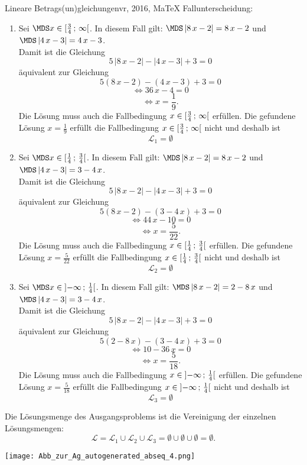 \begin{MAufgabe}{Lineare Betrags(un)gleichungen}{vr, 2016, MaTeX}
 Fallunterscheidung: 

 \begin{enumerate} 
 \item Sei $ \MDS x\in[ \frac{3}{4} \, \MIntvlSep \, \infty\MoIr $. 
 In diesem Fall gilt: 
  $ \MDS \left| 8\, x - 2\right|=8\, x - 2$ und $ \MDS \left| 4\, x - 3\right|=4\, x - 3$. \\ 
 Damit ist die Gleichung 
 $$ 
5\, \left|8\, x - 2\right| - \left|4\, x - 3\right| + 3= 0
$$
 \"aquivalent zur Gleichung
 $$ 
5\left(8\, x - 2\right)-\left( 4\, x - 3\right)+3= 0 
$$  
$$ 
 \Leftrightarrow 36\, x - 4= 0 
$$  
$$ \Leftrightarrow x = \frac{1}{9} . 
 $$ 
 Die L\"osung muss auch die Fallbedingung $x\in [ \frac{3}{4} \, ; \, \infty[\mbox{}  $ erf\"ullen. Die gefundene L\"osung $x=\frac{1}{9}$ erf\"ullt die Fallbedingung  $x\in [ \frac{3}{4} \, ; \, \infty[\mbox{} $ nicht und deshalb ist  $$
 \mathcal{L}_{1}=\emptyset 
 $$ 
\item Sei $ \MDS x\in[ \frac{1}{4} \, \MIntvlSep \, \frac{3}{4}\MoIr $. 
 In diesem Fall gilt: 
  $ \MDS \left| 8\, x - 2\right|=8\, x - 2$ und $ \MDS \left| 4\, x - 3\right|=3 - 4\, x$. \\ 
 Damit ist die Gleichung 
 $$ 
5\, \left|8\, x - 2\right| - \left|4\, x - 3\right| + 3= 0
$$
 \"aquivalent zur Gleichung
 $$ 
5\left(8\, x - 2\right)-\left( 3 - 4\, x\right)+3= 0 
$$  
$$ 
 \Leftrightarrow 44\, x - 10= 0 
$$  
$$ \Leftrightarrow x = \frac{5}{22} . 
 $$ 
 Die L\"osung muss auch die Fallbedingung $x\in [ \frac{1}{4} \, ; \, \frac{3}{4}[\mbox{}  $ erf\"ullen. Die gefundene L\"osung $x=\frac{5}{22}$ erf\"ullt die Fallbedingung  $x\in [ \frac{1}{4} \, ; \, \frac{3}{4}[\mbox{} $ nicht und deshalb ist  $$
 \mathcal{L}_{2}=\emptyset 
 $$ 
\item Sei $ \MDS x\in\MoIl  -\infty \, \MIntvlSep \, \frac{1}{4}\MoIr $. 
 In diesem Fall gilt: 
  $ \MDS \left| 8\, x - 2\right|=2 - 8\, x$ und $ \MDS \left| 4\, x - 3\right|=3 - 4\, x$. \\ 
 Damit ist die Gleichung 
 $$ 
5\, \left|8\, x - 2\right| - \left|4\, x - 3\right| + 3= 0
$$
 \"aquivalent zur Gleichung
 $$ 
5\left(2 - 8\, x\right)-\left( 3 - 4\, x\right)+3= 0 
$$  
$$ 
 \Leftrightarrow 10 - 36\, x= 0 
$$  
$$ \Leftrightarrow x = \frac{5}{18} . 
 $$ 
 Die L\"osung muss auch die Fallbedingung $x\in \mbox{}]\mathopen{}  -\infty \, ; \, \frac{1}{4}[\mbox{}  $ erf\"ullen. Die gefundene L\"osung $x=\frac{5}{18}$ erf\"ullt die Fallbedingung  $x\in \mbox{}]\mathopen{}  -\infty \, ; \, \frac{1}{4}[\mbox{} $ nicht und deshalb ist  $$
 \mathcal{L}_{3}=\emptyset 
 $$ 
 \end{enumerate} 
  Die L\"osungsmenge des Ausgangsproblems ist die Vereinigung der einzelnen L\"osungsmengen: 
$$ \mathcal{L} = \mathcal{L}_{1} \cup \mathcal{L}_{2} \cup \mathcal{L}_{3} 
 = \emptyset\cup \emptyset\cup \emptyset 
   =\emptyset 
   . $$ 
 
 \begin{center}
 \texttt{[image: Abb\_zur\_Ag\_autogenerated\_abseq\_4.png]} \end{center}
 
\else\relax\fi
 \end{MAufgabe}